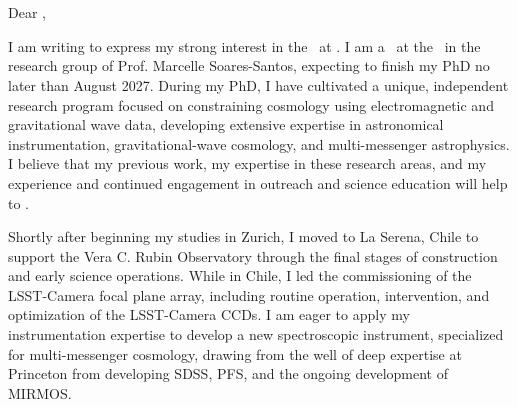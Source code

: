 \documentclass[10pt]{article}
\begin{document}
\begin{flushright}
\textbf{\ApplicantName}\\ 
\ApplicantInstitutionNameOne\\
\ApplicantInstitutionNameTwo\\
\ApplicantInstitutionAddressLine\\ \ApplicantInstitutionCityLine\\
\end{flushright}

\RecipientNameOne \hfill \LetterDate \\
\RecipientInstitution \\

Dear \RecipientNameTwo,

\vspace{0.25em}

I am writing to express my strong interest in the \PositionTitle\ at \RecipientInstitution. 
I am a \ApplicantTitle\ at the \ApplicantInstitutionNameTwo\ in the research group of Prof. Marcelle Soares-Santos, expecting to finish my PhD no later than August 2027.
During my PhD, I have cultivated a unique, independent research program focused on constraining cosmology using electromagnetic and gravitational wave data, developing extensive expertise in astronomical instrumentation, gravitational-wave cosmology, and multi-messenger astrophysics. I believe that my previous work, my expertise in these research areas, and my experience and continued engagement in outreach and science education will help to \HostGroupDescriptor.

Shortly after beginning my studies in Zurich, I moved to La Serena, Chile to support the Vera C. Rubin Observatory through the final stages of construction and early science operations.
While in Chile, I led the commissioning of the LSST-Camera focal plane array, including routine operation, intervention, and optimization of the LSST-Camera CCDs. 
\textcolor{\tcolor}{I am eager to apply my instrumentation expertise to develop a new spectroscopic instrument, specialized for multi-messenger cosmology, drawing from the well of deep expertise at Princeton from developing SDSS, PFS, and the ongoing development of MIRMOS.}
\end{document}

